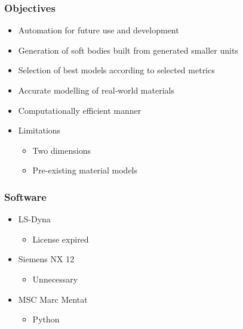 \documentclass[serif, pdf]{beamer}
\begin{document}
\begin{frame}
    \frametitle{Objectives}
    \begin{itemize}
        \item<1-> Automation for future use and development
        \item<2-> Generation of soft bodies built from generated smaller units
        \item<3-> Selection of best models according to selected metrics
        \item<4-> Accurate modelling of real-world materials
        \item<5-> Computationally efficient manner
        \item<6-> Limitations
        \changefontsizes{11pt}
        \begin{itemize}
            \item<7-> Two dimensions
            \item<8-> Pre-existing material models
        \end{itemize}
    \end{itemize}
\end{frame}


\changefontsizes{13pt}
\begin{frame}
    \frametitle{Software}
    \begin{itemize}
        \item<1-> LS-Dyna
        \changefontsizes{11pt}
        \begin{itemize}
            \item<2-> License expired
        \end{itemize}
        \item<3-> Siemens NX 12
        \changefontsizes{11pt}
        \begin{itemize}
            \item<4-> Unnecessary
        \end{itemize}
        \item<3-> MSC Marc Mentat
        \changefontsizes{11pt}
        \begin{itemize}
            \item<5-> Python
        \end{itemize}
    \end{itemize}
\end{frame}

\end{document}
